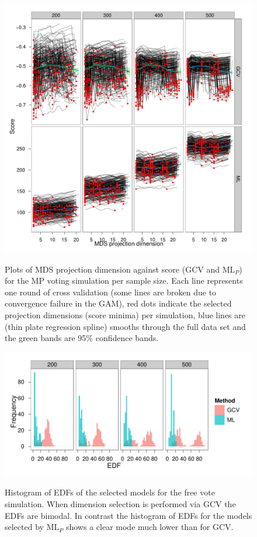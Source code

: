 \begin{figure}
\centering
\includegraphics[width=6in]{gds/figs/mps-dimselect.pdf} \\
\caption{Plots of MDS projection dimension against score (GCV and $\text{ML}_P$) for the MP voting simulation per sample size. Each line represents one round of cross validation (some lines are broken due to convergence failure in the GAM), red dots indicate the selected projection dimensions (score minima) per simulation, blue lines are (thin plate regression spline) smooths through the full data set and the green bands are 95\% confidence bands.}
\label{gds-mps-dimselect}
\end{figure}

\begin{figure}
\centering
\includegraphics[width=6in]{gds/figs/mps-edf.pdf} \\
\caption{Histogram of EDFs of the selected models for the free vote simulation. When dimension selection is performed via GCV the EDFs are bimodal. In contrast the histogram of EDFs for the models selected by $\text{ML}_P$ shows a clear mode much lower than for GCV.}
\label{gds-mps-edf}
\end{figure}


